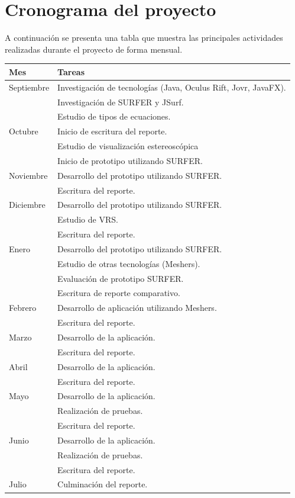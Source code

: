 \documentclass[12pt]{article}
\begin{document}
\section{Cronograma del proyecto}
A continuación se presenta una tabla que muestra las principales actividades realizadas durante el proyecto de forma mensual.
\begin{center}
    \begin{tabular}{ | l | p{9cm} |}
    \hline
    Mes &   Tareas \\ \hline
    Septiembre &  Investigación de tecnologías (Java, Oculus Rift, Jovr, JavaFX).\\ & Investigación de SURFER y JSurf. \\ & Estudio de tipos de ecuaciones.\\ \hline
    Octubre &  Inicio de escritura del reporte. \\ & Estudio de visualización estereoscópica \\ & Inicio de prototipo utilizando SURFER. \\ \hline
    Noviembre &  Desarrollo del prototipo utilizando SURFER.\\ & Escritura del reporte. \\ \hline
    Diciembre &  Desarrollo del prototipo utilizando SURFER.\\ & Estudio de VRS.\\ & Escritura del reporte. \\ \hline
    Enero &   Desarrollo del prototipo utilizando SURFER.\\ & Estudio de otras tecnologías (Meshers).\\ &  Evaluación de prototipo SURFER.\\ & Escritura de reporte comparativo.\\ \hline
    Febrero  & Desarrollo de aplicación utilizando Meshers. \\ & Escritura del reporte. \\ \hline
    Marzo &  Desarrollo de la aplicación.\\ & Escritura del reporte. \\ \hline
    Abril &  Desarrollo de la aplicación.\\ & Escritura del reporte. \\ \hline
    Mayo &  Desarrollo de la aplicación.\\ &  Realización de pruebas.\\ & Escritura del reporte. \\ \hline
    Junio &  Desarrollo de la aplicación.\\ &  Realización de pruebas.\\ & Escritura del reporte. \\ \hline
    Julio & Culminación del reporte. \\ \hline
    \hline
    \end{tabular}
\end{center}
\clearpage
\end{document}
